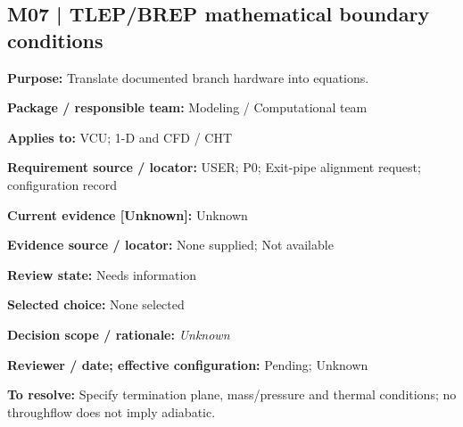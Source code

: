 \documentclass[11pt]{article}
\begin{document}
\par\noindent\begin{minipage}{\textwidth}\small\setlength{\parskip}{2pt}
\subsection*{M07 | TLEP/BREP mathematical boundary conditions}
\textbf{Purpose:} Translate documented branch hardware into equations.\par
\textbf{Package / responsible team:} Modeling / Computational team\par
\textbf{Applies to:} VCU; 1-D and CFD / CHT\par
\textbf{Requirement source / locator:} USER; P0; Exit-pipe alignment request; configuration record\par
\textbf{Current evidence [Unknown]:} Unknown\par
\textbf{Evidence source / locator:} None supplied; Not available\par
\textbf{Review state:} Needs information\par
\textbf{Selected choice:} None selected\par
\textbf{Decision scope / rationale:} \textit{Unknown}\par
\textbf{Reviewer / date; effective configuration:} Pending; Unknown\par
\textbf{To resolve:} Specify termination plane, mass/pressure and thermal conditions; no throughflow does not imply adiabatic.\par
\end{minipage}\par\vspace{5pt}
\end{document}
